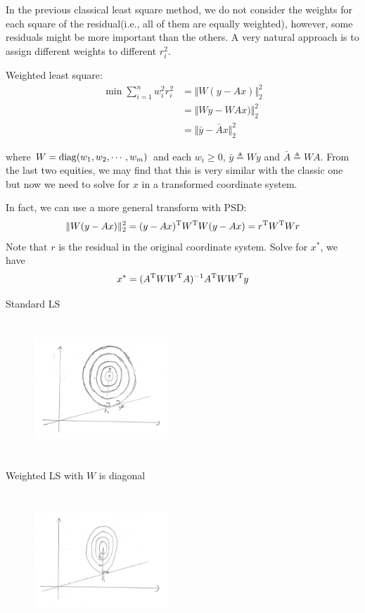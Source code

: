 In the previous classical least square method, we do not consider the weights for each square of the residual(i.e., all of them are equally weighted), however, some residuals might be more important than the others. A very natural approach is to assign different weights to different $r_i^2$.

\vspace{0.3cm}
Weighted least square:
\begin{align*}
\min \sum_{i=1}^{n} w_i^2 r_i^2
&=\Vert W (y-Ax)\Vert ^2_2\\
&=\Vert Wy-WAx)\Vert ^2_2\\
&=\Vert \bar{y}-\bar{A}x \Vert ^2_2
\end{align*}

where $W=\operatorname{diag}(w_1, w_2, \cdots, w_m)$ and each $w_i\geq 0$, $\bar{y} \triangleq Wy$ and $\bar{A} \triangleq WA$. From the last two equities, we may find that this is very similar with the classic one but now we need to solve for $x$ in a transformed coordinate system.

In fact, we can use a more general transform with PSD:
$$\Vert W (y-Ax)\Vert ^2_2 = (y-Ax)^{{\rm T}}W^{{\rm T}}W(y-Ax)=r^{{\rm T}}W^{{\rm T}}Wr$$
Note that $r$ is the residual in the original coordinate system. Solve for $x^*$, we have 
$$x^*=(A^{{\rm T}} W W^{{\rm T}} A)^{-1} A^{{\rm T}} W W^{{\rm T}} y$$

\vspace{0.3cm}
Standard LS
\begin{figure}
	\centering
	\includegraphics[width=2in,height=2in]{figures/ch06/ch06-03.jpg}
\end{figure}

Weighted LS with $W$ is diagonal 

\begin{figure}
	\centering
	\includegraphics[width=2in,height=2in]{figures/ch06/ch06-04.jpg}
\end{figure}

